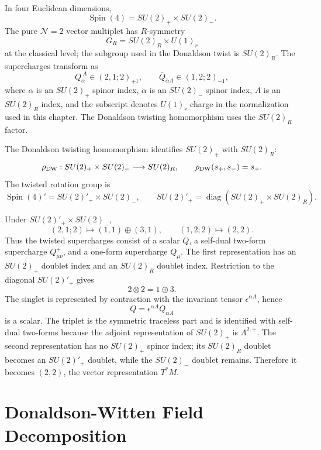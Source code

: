 In four Euclidean dimensions,
\[
  \operatorname{Spin}(4)=SU(2)_+\times SU(2)_- .
\]
The pure \(\mathcal N=2\) vector multiplet has \(R\)-symmetry
\[
  G_R=SU(2)_R\times U(1)_r
\]
at the classical level; the subgroup used in the Donaldson twist is
\(SU(2)_R\).  The supercharges transform as
\begin{equation}
  Q_\alpha^{\ A}\in (2,1;2)_{+1},
  \qquad
  \bar Q_{\dot\alpha A}\in (1,2;2)_{-1},
  \label{eq:n2-supercharge-representations}
\end{equation}
where \(\alpha\) is an \(SU(2)_+\) spinor index,
\(\dot\alpha\) is an \(SU(2)_-\) spinor index, \(A\) is an \(SU(2)_R\)
index, and the subscript denotes \(U(1)_r\) charge in the normalization used
in this chapter.  The Donaldson twisting homomorphism uses the \(SU(2)_R\)
factor.

The Donaldson twisting homomorphism identifies \(SU(2)_+\) with \(SU(2)_R\):
\[
  \rho_{\rm DW}:SU(2)_+\times SU(2)_-\longrightarrow SU(2)_R,
  \qquad
  \rho_{\rm DW}(s_+,s_-)=s_+ .
\]
The twisted rotation group is
\[
  \operatorname{Spin}(4)'=SU(2)'_+\times SU(2)_-,
  \qquad
  SU(2)'_+=\operatorname{diag}(SU(2)_+\times SU(2)_R).
\]

Under \(SU(2)'_+\times SU(2)_-\),
\[
  (2,1;2)
  \longmapsto
  (1,1)\oplus(3,1),
  \qquad
  (1,2;2)
  \longmapsto
  (2,2).
\]
Thus the twisted supercharges consist of a scalar \(Q\), a self-dual
two-form supercharge \(Q^+_{\mu\nu}\), and a one-form supercharge
\(Q_\mu\).
The first representation has an \(SU(2)_+\) doublet index and an \(SU(2)_R\)
doublet index.  Restriction to the diagonal \(SU(2)'_+\) gives
\[
  2\otimes 2=1\oplus3 .
\]
The singlet is represented by contraction with the invariant tensor
\(\epsilon^{\alpha A}\), hence
\[
  Q=\epsilon^{\alpha A}Q_{\alpha A}
\]
is a scalar.  The triplet is the symmetric traceless part and is identified
with self-dual two-forms because the adjoint representation of \(SU(2)_+\)
is \(\Lambda^{2,+}\).  The second representation has no \(SU(2)_+\) spinor
index; its \(SU(2)_R\) doublet becomes an \(SU(2)'_+\) doublet, while the
\(SU(2)_-\) doublet remains.  Therefore it becomes \((2,2)\), the vector
representation \(T^\ast M\).

\section{Donaldson-Witten Field Decomposition}

